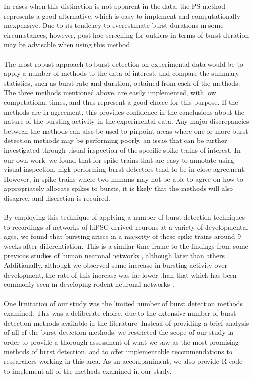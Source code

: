 \documentclass[12pt, titlepage]{article}
\begin{document}
In cases when this distinction is not apparent in the data, the PS method represents a good alternative, which is easy to implement and computationally inexpensive. Due to its tendency to overestimate burst durations in some circumstances, however, post-hoc screening for outliers in terms of burst duration may be advisable when using this method.  
\\ \\The most robust approach to burst detection on experimental data would be to apply a number of methods to the data of interest, and compare the summary statistics, such as burst rate and duration, obtained from each of the methods. The three methods mentioned above, are easily implemented, with low computational times, and thus represent a good choice for this purpose. If the methods are in agreement, this provides confidence in the conclusions about the nature of the bursting activity in the experimental data. Any major discrepancies between the methods can also be used to pinpoint areas where one or more burst detection methods may be performing poorly, an issue that can be further investigated through visual inspection of the specific spike trains of interest. In our own work, we found that for spike trains that are easy to annotate using visual inspection, high performing burst detectors tend to be in close agreement. However, in spike trains where two humans may not be able to agree on how to appropriately allocate spikes to bursts, it is likely that the methods will also disagree, and discretion is required.
\\ \\By employing this technique of applying a number of burst detection techniques to recordings of networks of hiPSC-derived neurons at a variety of developmental ages, we found that bursting arises in a majority of these spike trains around 9 weeks after differentiation.  This is a similar time frame to the findings from some previous studies of human neuronal networks \cite{Heikkila2009}, although later than others \cite{Illes2007}. Additionally, although we observed some increase in bursting activity over development, the rate of this increase was far lower than that which has been commonly seen in developing rodent neuronal networks \cite{Chiappalone2005,Charlesworth2015,Demas2003}.
\\ \\One limitation of our study was the limited number of burst detection methods examined. This was a deliberate choice, due to the extensive number of burst detection methods available in the literature. Instead of providing a brief analysis of all of the burst detection methods, we restricted the scope of our study in order to provide a thorough assessment of what we saw as the most promising methods of burst detection, and to offer implementable recommendations to researchers working in this area. As an accompaniment, we also provide R code to implement all of the methods examined in our study.
\end{document}
